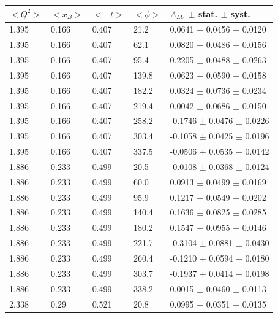\begin{table}[!h]
   \begin{center}
      \begin{tabular}{||l|l|l|l|l||}
         \hline
 $<Q^{2}>$ & $<x_{B}>$ & $<-t>$ & $<\phi>$ & $A_{LU}$ $\pm$ stat. $\pm$ syst.\\
 \hline 
   1.395 & 0.166 & 0.407 & 21.2  &  0.0641 $\pm$ 0.0456 $\pm$ 0.0120 \\
   1.395 & 0.166 & 0.407 & 62.1  &  0.0820 $\pm$ 0.0486 $\pm$ 0.0156 \\
   1.395 & 0.166 & 0.407 & 95.4  &  0.2205 $\pm$ 0.0488 $\pm$ 0.0263 \\
   1.395 & 0.166 & 0.407 & 139.8 &  0.0623 $\pm$ 0.0590 $\pm$ 0.0158 \\
   1.395 & 0.166 & 0.407 & 182.2 &  0.0324 $\pm$ 0.0736 $\pm$ 0.0234 \\
   1.395 & 0.166 & 0.407 & 219.4 &  0.0042 $\pm$ 0.0686 $\pm$ 0.0150 \\
   1.395 & 0.166 & 0.407 & 258.2 & -0.1746 $\pm$ 0.0476 $\pm$ 0.0226 \\
   1.395 & 0.166 & 0.407 & 303.4 & -0.1058 $\pm$ 0.0425 $\pm$ 0.0196 \\
   1.395 & 0.166 & 0.407 & 337.5 & -0.0506 $\pm$ 0.0535 $\pm$ 0.0142 \\
  \hline                                                               
   1.886 & 0.233 & 0.499 & 20.5  & -0.0108 $\pm$ 0.0368 $\pm$ 0.0124 \\
   1.886 & 0.233 & 0.499 & 60.0  &  0.0913 $\pm$ 0.0499 $\pm$ 0.0169 \\
   1.886 & 0.233 & 0.499 & 95.9  &  0.1217 $\pm$ 0.0549 $\pm$ 0.0202 \\
   1.886 & 0.233 & 0.499 & 140.4 &  0.1636 $\pm$ 0.0825 $\pm$ 0.0285 \\
   1.886 & 0.233 & 0.499 & 180.2 &  0.1547 $\pm$ 0.0955 $\pm$ 0.0146 \\
   1.886 & 0.233 & 0.499 & 221.7 & -0.3104 $\pm$ 0.0881 $\pm$ 0.0430 \\
   1.886 & 0.233 & 0.499 & 260.4 & -0.1210 $\pm$ 0.0594 $\pm$ 0.0180 \\
   1.886 & 0.233 & 0.499 & 303.7 & -0.1937 $\pm$ 0.0414 $\pm$ 0.0198 \\
   1.886 & 0.233 & 0.499 & 338.2 &  0.0015 $\pm$ 0.0460 $\pm$ 0.0113 \\
  \hline                                                               
   2.338 & 0.29 & 0.521  & 20.8  &  0.0995 $\pm$ 0.0351 $\pm$ 0.0135 \\

\end{tabular}
\end{center}
\end{table}
